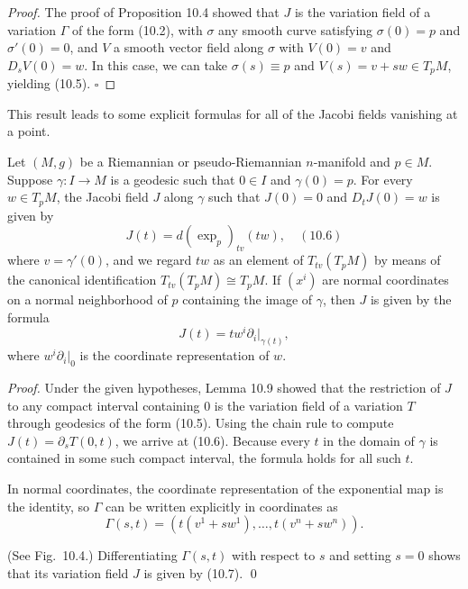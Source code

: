 \begin{proof}
The proof of Proposition 10.4 showed that $J$ is the variation field of a variation $\Gamma$ of the form (10.2), with $\sigma$ any smooth curve satisfying $\sigma(0) = p$ and $\sigma'(0) = 0$, and $V$ a smooth vector field along $\sigma$ with $V(0) = v$ and $D_s V(0) = w$. In this case, we can take $\sigma(s) \equiv p$ and $V(s) = v + sw \in T_p M$, yielding (10.5). $\square$
\end{proof}


This result leads to some explicit formulas for all of the Jacobi fields vanishing at a point.

\begin{proposition}
\label{prop:jacobi-fields-vanishing-at-point}
Let $(M, g)$ be a Riemannian or pseudo-Riemannian $n$-manifold and $p \in M$. Suppose $\gamma : I \to M$ is a geodesic such that $0 \in I$ and $\gamma(0) = p$. For every $w \in T_p M$, the Jacobi field $J$ along $\gamma$ such that $J(0) = 0$ and $D_t J(0) = w$ is given by
$$J(t) = d(\exp_p)_{tv}(tw), \quad (10.6)$$
where $v = \gamma'(0)$, and we regard $tw$ as an element of $T_{tv}(T_p M)$ by means of the canonical identification $T_{tv}(T_p M) \cong T_p M$. If $(x^i)$ are normal coordinates on a normal neighborhood of $p$ containing the image of $\gamma$, then $J$ is given by the formula
\begin{equation}
J(t) = tw^i\partial_i\bigg|_{\gamma(t)}, \tag{10.7}
\end{equation}
where $w^i \partial_i\big|_0$ is the coordinate representation of $w$.
\end{proposition}

\begin{proof}
Under the given hypotheses, Lemma 10.9 showed that the restriction of $J$ to any compact interval containing $0$ is the variation field of a variation $T$ through geodesics of the form (10.5). Using the chain rule to compute $J(t) = \partial_s T(0,t)$, we arrive at (10.6). Because every $t$ in the domain of $\gamma$ is contained in some such compact interval, the formula holds for all such $t$.

In normal coordinates, the coordinate representation of the exponential map is the identity, so $\Gamma$ can be written explicitly in coordinates as
\[
\Gamma(s,t) = (t(v^1 + sw^1), \ldots, t(v^n + sw^n)).
\]


(See Fig.~10.4.) Differentiating $\Gamma(s,t)$ with respect to $s$ and setting $s = 0$ shows that its variation field $J$ is given by (10.7). \qed
\end{proof}

